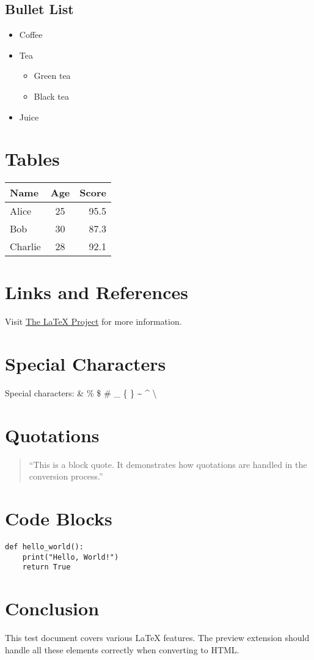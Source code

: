 \documentclass[11pt]{article}
\begin{document}
\subsection{Bullet List}
\begin{itemize}
    \item Coffee
    \item Tea
    \begin{itemize}
        \item Green tea
        \item Black tea
    \end{itemize}
    \item Juice
\end{itemize}

\section{Tables}
\begin{center}
\begin{tabular}{|l|c|r|}
\hline
\textbf{Name} & \textbf{Age} & \textbf{Score} \\
\hline
Alice & 25 & 95.5 \\
Bob & 30 & 87.3 \\
Charlie & 28 & 92.1 \\
\hline
\end{tabular}
\end{center}

\section{Links and References}
Visit \href{https://www.latex-project.org/}{The LaTeX Project} for more information.

\section{Special Characters}
Special characters: \& \% \$ \# \_ \{ \} \textasciitilde{} \textasciicircum{} \textbackslash{}

\section{Quotations}
\begin{quote}
    ``This is a block quote. It demonstrates how quotations are handled in the conversion process.''
\end{quote}

\section{Code Blocks}
\begin{verbatim}
def hello_world():
    print("Hello, World!")
    return True
\end{verbatim}

\section{Conclusion}
This test document covers various LaTeX features. The preview extension should handle all these elements correctly when converting to HTML.
\end{document}
